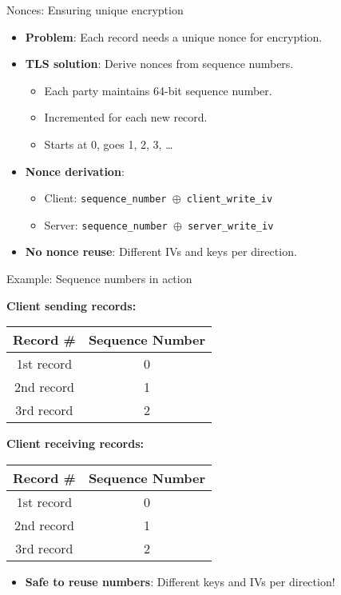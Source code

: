 \documentclass[aspectratio=169, lualatex, handout]{beamer}
\begin{document}
\begin{frame}{Nonces: Ensuring unique encryption}
	\begin{itemize}[<+->]
		\item \textbf{Problem}: Each record needs a unique nonce for encryption.
		\item \textbf{TLS solution}: Derive nonces from sequence numbers.
		      \begin{itemize}
			      \item Each party maintains 64-bit sequence number.
			      \item Incremented for each new record.
			      \item Starts at 0, goes 1, 2, 3, \ldots
		      \end{itemize}
		\item \textbf{Nonce derivation}:
		      \begin{itemize}
			      \item Client: \texttt{sequence\_number $\oplus$ client\_write\_iv}
			      \item Server: \texttt{sequence\_number $\oplus$ server\_write\_iv}
		      \end{itemize}
		\item \textbf{No nonce reuse}: Different IVs and keys per direction.
	\end{itemize}
\end{frame}

\begin{frame}{Example: Sequence numbers in action}
	\begin{center}
		\textbf{Client sending records:}
		\begin{tabular}{|c|c|}
			\hline
			\textbf{Record \#} & \textbf{Sequence Number} \\
			\hline
			1st record         & 0                        \\
			\hline
			2nd record         & 1                        \\
			\hline
			3rd record         & 2                        \\
			\hline
		\end{tabular}
	\end{center}
	\pause
	\begin{center}
		\textbf{Client receiving records:}
		\begin{tabular}{|c|c|}
			\hline
			\textbf{Record \#} & \textbf{Sequence Number} \\
			\hline
			1st record         & 0                        \\
			\hline
			2nd record         & 1                        \\
			\hline
			3rd record         & 2                        \\
			\hline
		\end{tabular}
	\end{center}
	\pause
	\begin{itemize}
		\item \textbf{Safe to reuse numbers}: Different keys and IVs per direction!
	\end{itemize}
\end{frame}
\end{document}
